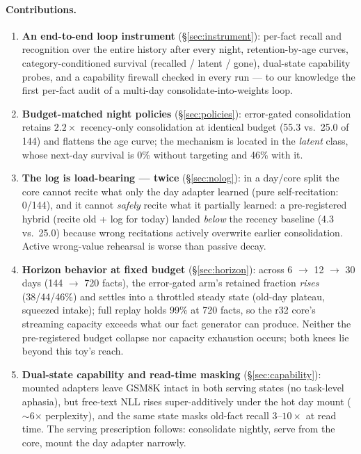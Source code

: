 \documentclass[11pt]{article}
\begin{document}
\paragraph{Contributions.}
\begin{enumerate}
\item \textbf{An end-to-end loop instrument} (\S\ref{sec:instrument}): per-fact recall and
recognition over the entire history after every night, retention-by-age curves, category-conditioned
survival (recalled / latent / gone), dual-state capability probes, and a capability firewall checked
in every run --- to our knowledge the first per-fact audit of a multi-day consolidate-into-weights
loop.
\item \textbf{Budget-matched night policies} (\S\ref{sec:policies}): error-gated consolidation
retains $2.2\times$ recency-only consolidation at identical budget (55.3 vs.\ 25.0 of 144) and
flattens the age curve; the mechanism is located in the \emph{latent} class, whose next-day survival
is 0\% without targeting and 46\% with it.
\item \textbf{The log is load-bearing --- twice} (\S\ref{sec:nolog}): in a day/core split the core
cannot recite what only the day adapter learned (pure self-recitation: 0/144), and it cannot
\emph{safely} recite what it partially learned: a pre-registered hybrid (recite old + log for today)
landed \emph{below} the recency baseline (4.3 vs.\ 25.0) because wrong recitations actively
overwrite earlier consolidation. Active wrong-value rehearsal is worse than passive decay.
\item \textbf{Horizon behavior at fixed budget} (\S\ref{sec:horizon}): across 6 $\to$ 12 $\to$ 30
days (144 $\to$ 720 facts), the error-gated arm's retained fraction \emph{rises} (38/44/46\%) and
settles into a throttled steady state (old-day plateau, squeezed intake); full replay holds 99\% at
720 facts, so the r32 core's streaming capacity exceeds what our fact generator can produce. Neither
the pre-registered budget collapse nor capacity exhaustion occurs; both knees lie beyond this toy's
reach.
\item \textbf{Dual-state capability and read-time masking} (\S\ref{sec:capability}): mounted
adapters leave GSM8K intact in both serving states (no task-level aphasia), but free-text NLL rises
super-additively under the hot day mount ($\sim$6$\times$ perplexity), and the same state masks old-fact
recall $3$--$10\times$ at read time. The serving prescription follows: consolidate nightly, serve
from the core, mount the day adapter narrowly.
\end{enumerate}
\end{document}

